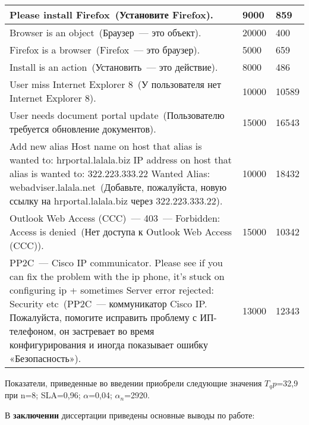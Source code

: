 \begin{longtable}{|p{12cm}|p{2cm}|p{2cm}|}
  \hline
  Please install Firefox~(Установите Firefox).   & 9000 & 859 \\
  \hline
  Browser is an object~(Браузер~--- это объект).   & 20000 & 400 \\
  \hline
  Firefox is a browser~(Firefox~--- это браузер).   & 5000 & 659  \\
  \hline
  Install is an action~(Установить~--- это действие).   & 8000 & 486 \\
  \hline
  User miss Internet Explorer 8~(У пользователя нет Internet Explorer 8).     & 10000 & 10589 \\
  \hline
  User needs document portal update~(Пользователю требуется обновление документов).    & 15000 & 16543 \\
  \hline
  Add new alias Host name on host that alias is wanted to: hrportal.lalala.biz IP address on host that alias is wanted to: 322.223.333.22 Wanted Alias:    webadviser.lalala.net~(Добавьте, пожалуйста, новую ссылку на hrportal.lalala.biz через 322.223.333.22).    & 10000 & 18432  \\ 
  \hline
  Outlook Web Access (CCC)~--- 403~--- Forbidden: Access is denied~(Нет доступа к Outlook Web Access (CCC)). & 15000 & 10342\\ 
  \hline
  PP2C~--- Cisco IP communicator. Please see if you can fix the problem with the ip phone, it's stuck on configuring ip + sometimes Server error rejected: Security etc~(PP2C~--- коммуникатор Cisco IP. Пожалуйста, помогите исправить проблему с ИП-телефоном, он застревает во время конфигурирования и иногда показывает ошибку «Безопасность»).  & 13000 & 12343 \\ 
   
  \end{longtable}
  
  Показатели, приведенные во введении приобрели следующие значения $T_qp$=32,9 при n=8; SLA=0,96; $\alpha$=0,04;  $\alpha_n$=2920. 

В \textbf{заключении} диссертации приведены основные выводы по работе:


 

\renewcommand{\refname}{\large Публикации автора по теме диссертации}

\insertbiblioall

